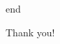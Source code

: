 \documentclass[aspectratio=169, UTF8]{beamer}
\begin{document}


\begin{frame}{\textcolor{green!30!black}{end}}
    \begin{center}
        \LARGE Thank you!
    \end{center}
\end{frame}
\end{document}
